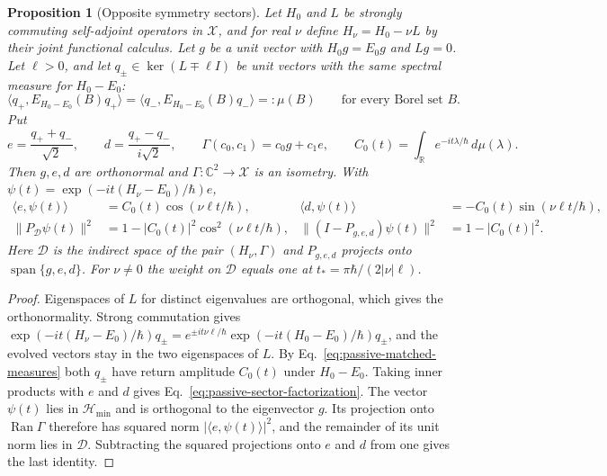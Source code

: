 \documentclass[11pt]{article}
\newtheorem{proposition}{Proposition}[section]
\theoremstyle{definition}
\DeclareMathOperator{\Ran}{Ran}
\DeclareMathOperator{\Span}{span}
\newcommand{\C}{\mathbb C}
\newcommand{\R}{\mathbb R}
\newcommand{\Hmin}{\mathcal H_{\min}}
\begin{document}
\begin{proposition}[Opposite symmetry sectors]
\label{prop:passive-opposite-sectors}
Let $H_0$ and $L$ be strongly commuting self-adjoint operators in $\mathcal X$, and for real $\nu$ define $H_\nu=H_0-\nu L$ by their joint functional calculus. Let $g$ be a unit vector with $H_0g=E_0g$ and $Lg=0$. Let $\ell>0$, and let $q_\pm\in\ker(L\mp\ell I)$ be unit vectors with the same spectral measure for $H_0-E_0$:
\begin{equation}
 \langle q_+,E_{H_0-E_0}(B)q_+\rangle=\langle q_-,E_{H_0-E_0}(B)q_-\rangle=:\mu(B)
 \qquad\text{for every Borel set }B .
 \label{eq:passive-matched-measures}
\end{equation}
Put
\[
 e=\frac{q_++q_-}{\sqrt2},\qquad d=\frac{q_+-q_-}{i\sqrt2},\qquad
 \Gamma(c_0,c_1)=c_0g+c_1e,\qquad
 C_0(t)=\int_\R e^{-it\lambda/\hbar}\,d\mu(\lambda).
\]
Then $g,e,d$ are orthonormal and $\Gamma:\C^2\to\mathcal X$ is an isometry. With $\psi(t)=\exp(-it(H_\nu-E_0)/\hbar)e$,
\begin{align}
 \langle e,\psi(t)\rangle&=C_0(t)\cos(\nu\ell t/\hbar),
 &\langle d,\psi(t)\rangle&=-C_0(t)\sin(\nu\ell t/\hbar),
 \label{eq:passive-sector-factorization}\\
 \|P_{\mathcal D}\psi(t)\|^2&=1-|C_0(t)|^2\cos^2(\nu\ell t/\hbar),
 &\|(I-P_{g,e,d})\psi(t)\|^2&=1-|C_0(t)|^2 .
 \label{eq:passive-sector-departure}
\end{align}
Here $\mathcal D$ is the indirect space of the pair $(H_\nu,\Gamma)$ and $P_{g,e,d}$ projects onto $\Span\{g,e,d\}$. For $\nu\ne0$ the weight on $\mathcal D$ equals one at $t_*=\pi\hbar/(2|\nu|\ell)$.
\end{proposition}
\begin{proof}
Eigenspaces of $L$ for distinct eigenvalues are orthogonal, which gives the orthonormality. Strong commutation gives $\exp(-it(H_\nu-E_0)/\hbar)q_\pm=e^{\pm it\nu\ell/\hbar}\exp(-it(H_0-E_0)/\hbar)q_\pm$, and the evolved vectors stay in the two eigenspaces of $L$. By Eq.~\eqref{eq:passive-matched-measures} both $q_\pm$ have return amplitude $C_0(t)$ under $H_0-E_0$. Taking inner products with $e$ and $d$ gives Eq.~\eqref{eq:passive-sector-factorization}. The vector $\psi(t)$ lies in $\Hmin$ and is orthogonal to the eigenvector $g$. Its projection onto $\Ran\Gamma$ therefore has squared norm $|\langle e,\psi(t)\rangle|^2$, and the remainder of its unit norm lies in $\mathcal D$. Subtracting the squared projections onto $e$ and $d$ from one gives the last identity.
\end{proof}
\end{document}

